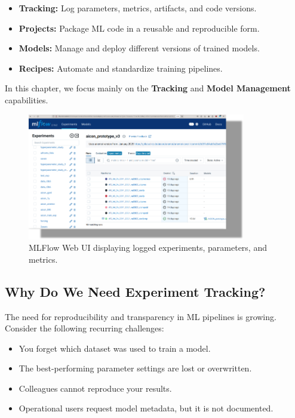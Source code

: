 \begin{itemize}
    \item \textbf{Tracking:} Log parameters, metrics, artifacts, and code versions.
    \item \textbf{Projects:} Package ML code in a reusable and reproducible form.
    \item \textbf{Models:} Manage and deploy different versions of trained models.
    \item \textbf{Recipes:} Automate and standardize training pipelines.
\end{itemize}

In this chapter, we focus mainly on the \textbf{Tracking} and \textbf{Model Management} capabilities.

\begin{figure}[htbp]
    \centering
    \includegraphics[width=0.85\textwidth]{images/MLFlow.png}
    \caption{MLFlow Web UI displaying logged experiments, parameters, and metrics.}
    \label{fig:mlflow_ui}
\end{figure}

%
\subsection{Why Do We Need Experiment Tracking?}

The need for reproducibility and transparency in ML pipelines is growing. Consider the following recurring challenges:

\begin{itemize}
    \item You forget which dataset was used to train a model.
    \item The best-performing parameter settings are lost or overwritten.
    \item Colleagues cannot reproduce your results.
    \item Operational users request model metadata, but it is not documented.
\end{itemize}

